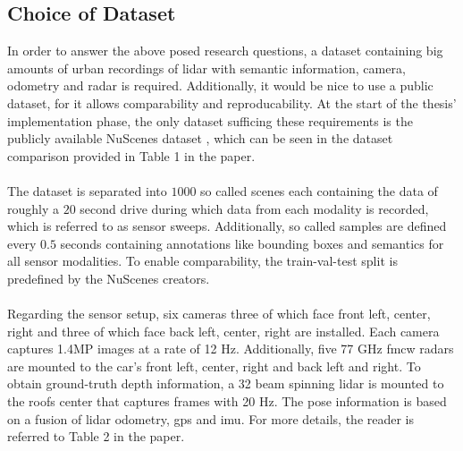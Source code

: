 \subsection{Choice of Dataset}
\label{subsec:choice_of_dataset}
In order to answer the above posed research questions, a dataset containing big amounts of urban recordings of lidar with semantic information, camera, odometry and radar is required. Additionally, it would be nice to use a public dataset, for it allows comparability and reproducability. At the start of the thesis' implementation phase, the only dataset sufficing these requirements is the publicly available NuScenes dataset \cite{caesar2020nuscenes}, which can be seen in the dataset comparison provided in Table 1 in the paper.
\\\\
The dataset is separated into $1000$ so called scenes each containing the data of roughly a $20$ second drive during which data from each modality is recorded, which is referred to as sensor sweeps. Additionally, so called samples are defined every $0.5$ seconds containing annotations like bounding boxes and semantics for all sensor modalities. To enable comparability, the train-val-test split is predefined by the NuScenes creators.
\\\\
Regarding the sensor setup, six cameras three of which face front left, center, right and three of which face back left, center, right are installed. Each camera captures 1.4MP images at a rate of 12 Hz. Additionally, five 77 GHz \gls{fmcw} radars are mounted to the car's front left, center, right and back left and right. To obtain ground-truth depth information, a 32 beam spinning lidar is mounted to the roofs center that captures frames with 20 Hz. The pose information is based on a fusion of lidar odometry, \gls{gps} and \gls{imu}.  For more details, the reader is referred to Table 2 in the paper.
%
